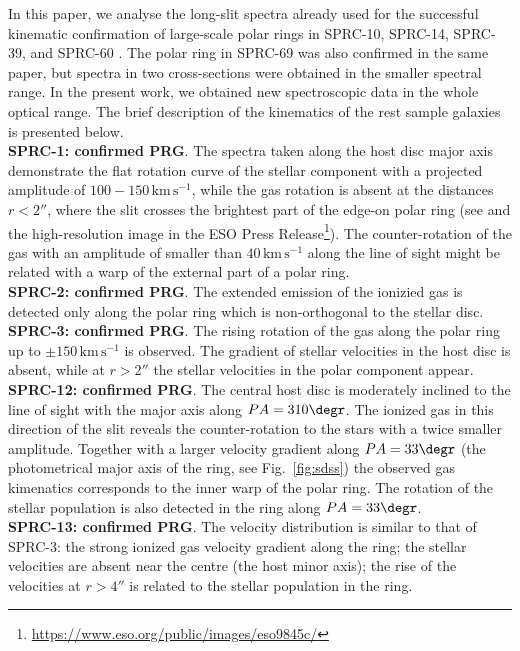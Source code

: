 \documentclass[useAMS,usenatbib]{mnras}
\newcommand{\kms}{\,\mbox{km}\,\mbox{s}^{-1}}
\begin{document}
In this paper, we analyse  the  long-slit spectra already used for the successful kinematic confirmation of large-scale polar rings in SPRC-10, SPRC-14, SPRC-39, and SPRC-60 \citep{sprc}. The polar ring in SPRC-69 was also confirmed in the same paper, but spectra in two cross-sections were obtained in the smaller  spectral range. In the present work, we obtained new spectroscopic data in the whole optical range. The brief description of the  kinematics of the rest sample galaxies is presented below.
\\
\textbf{SPRC-1: confirmed PRG}. The spectra taken along the host disc major axis demonstrate the flat rotation curve of the stellar component with a projected amplitude of $100-150\kms$, while the gas rotation is absent at the distances  $r<2''$,  where the slit crosses the brightest part of the edge-on polar ring (see \citealt{Reshetnikov2011} and the high-resolution image in the  ESO Press Release\footnote{\url{https://www.eso.org/public/images/eso9845c/}}). The  counter-rotation of the gas with an  amplitude of smaller than $40\kms$ along the line of sight might be related with a warp of the external part of a polar ring.  
\\
\textbf{SPRC-2: confirmed PRG}. The  extended emission of the ionizied gas is detected only along the polar ring which is non-orthogonal to the stellar disc. 
\\
\textbf{SPRC-3: confirmed PRG}. The rising rotation of the gas along the polar ring up to $\pm150\kms$ is observed. The  gradient of stellar velocities in the host disc is absent, while at $r>2''$ the stellar velocities  in the polar component  appear.
\\
\textbf{SPRC-12: confirmed PRG}. The central host disc is moderately inclined to the line of sight with the major axis  along $PA=310\degr$. The ionized gas in this  direction of the slit reveals the counter-rotation to the stars with a twice smaller amplitude. Together with a larger velocity gradient  along  $PA=33\degr$ (the photometrical major axis of the ring, see Fig.~\ref{fig:sdss}) the observed gas kimenatics corresponds to the inner warp of the polar ring. The rotation of the stellar population is also detected in the ring  along  $PA=33\degr$.
\\
\textbf{SPRC-13: confirmed PRG}. The velocity distribution is similar to that of SPRC-3: the strong ionized gas velocity gradient along the ring; the stellar velocities are absent near the centre (the host minor axis); the rise of the velocities  at $r>4''$ is related to  the stellar population in the ring. 
\end{document}
